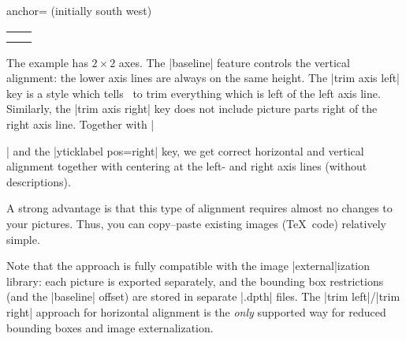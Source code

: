 \begin{pgfplotskey}{anchor= (initially south west)}
\begin{minipage}
\begin{tabular}
\begin{codeexample}[vbox]
\pgfplotsset{
	small,
	title=Trimmed bounding boxes
}
\begin{center}
\begin{tabular}{rl}
	\begin{tikzpicture}[baseline,trim axis left]
		\begin{axis}
			\addplot {x};
		\end{axis}
	\end{tikzpicture}
	&
	\begin{tikzpicture}[baseline,trim axis right]
	\begin{axis}[
		ylabel={$f(x)=x^2$},
		yticklabel pos=right,
		ylabel style={font=\Huge}]
		\addplot {x^2};
	\end{axis}
	\end{tikzpicture}
	\\
	\begin{tikzpicture}[baseline,trim axis left]
	\begin{axis}[xlabel=$x$,xlabel style={font=\Huge}]
		\addplot {x^3};
	\end{axis}
	\end{tikzpicture}%
	&
	\begin{tikzpicture}[baseline,trim axis right]
	\begin{axis}[yticklabel pos=right]
		\addplot {x^4};
	\end{axis}
	\end{tikzpicture}%
	\\
\end{tabular}%
\end{center}
\end{codeexample}
\noindent The example has $2 \times 2$ axes. The |baseline| feature controls the vertical alignment: the lower axis lines are always on the same height. The |trim axis left| key is a style which tells \Tikz\ to trim everything which is left of the left axis line. Similarly, the |trim axis right| key does not include picture parts right of the right axis line. Together with |\begin{center}| and the |yticklabel pos=right| key, we get correct horizontal and vertical alignment together with centering at the left- and right axis lines (without descriptions).

A strong advantage is that this type of alignment requires almost no changes to your pictures. Thus, you can copy--paste existing images (\TeX\ code) relatively simple.

Note that the approach is fully compatible with the image |external|ization library: each picture is exported separately, and the bounding box restrictions (and the |baseline| offset) are stored in separate |.dpth| files. The |trim left|/|trim right| approach for horizontal alignment is the \emph{only} supported way for reduced bounding boxes and image externalization.



\end{center}
\end{tabular}
\end{minipage}
\end{pgfplotskey}
